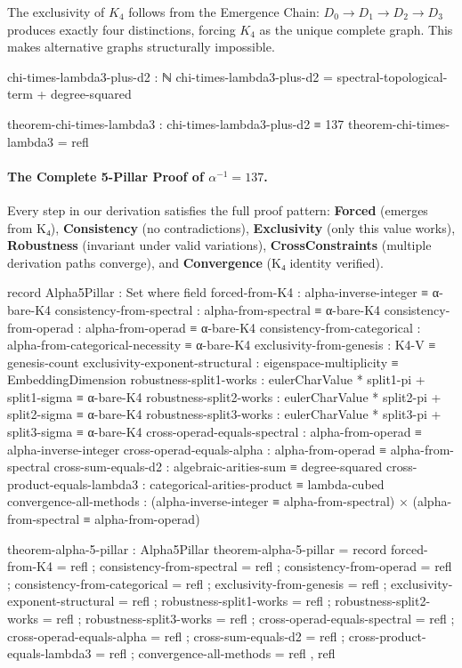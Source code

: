 \documentclass[11pt,a4paper]{book}
\begin{document}
The exclusivity of $K_4$ follows from the Emergence Chain: $D_0 \to D_1 \to D_2 \to D_3$ produces exactly
four distinctions, forcing $K_4$ as the unique complete graph. This makes alternative graphs structurally impossible.

\begin{code}
chi-times-lambda3-plus-d2 : ℕ
chi-times-lambda3-plus-d2 = spectral-topological-term + degree-squared

theorem-chi-times-lambda3 : chi-times-lambda3-plus-d2 ≡ 137
theorem-chi-times-lambda3 = refl
\end{code}

\paragraph{The Complete 5-Pillar Proof of $\alpha^{-1} = 137$.}

Every step in our derivation satisfies the full proof pattern:
\textbf{Forced} (emerges from K₄),
\textbf{Consistency} (no contradictions), 
\textbf{Exclusivity} (only this value works),
\textbf{Robustness} (invariant under valid variations),
\textbf{CrossConstraints} (multiple derivation paths converge), and
\textbf{Convergence} (K₄ identity verified).

\begin{code}
record Alpha5Pillar : Set where
  field
    forced-from-K4               : alpha-inverse-integer ≡ α-bare-K4
    consistency-from-spectral      : alpha-from-spectral ≡ α-bare-K4
    consistency-from-operad        : alpha-from-operad ≡ α-bare-K4
    consistency-from-categorical   : alpha-from-categorical-necessity ≡ α-bare-K4
    exclusivity-from-genesis       : K4-V ≡ genesis-count
    exclusivity-exponent-structural : eigenspace-multiplicity ≡ EmbeddingDimension
    robustness-split1-works        : eulerCharValue * split1-pi + split1-sigma ≡ α-bare-K4
    robustness-split2-works        : eulerCharValue * split2-pi + split2-sigma ≡ α-bare-K4
    robustness-split3-works        : eulerCharValue * split3-pi + split3-sigma ≡ α-bare-K4
    cross-operad-equals-spectral   : alpha-from-operad ≡ alpha-inverse-integer
    cross-operad-equals-alpha      : alpha-from-operad ≡ alpha-from-spectral
    cross-sum-equals-d2            : algebraic-arities-sum ≡ degree-squared
    cross-product-equals-lambda3   : categorical-arities-product ≡ lambda-cubed
    convergence-all-methods        : (alpha-inverse-integer ≡ alpha-from-spectral) × (alpha-from-spectral ≡ alpha-from-operad)

theorem-alpha-5-pillar : Alpha5Pillar
theorem-alpha-5-pillar = record
  { forced-from-K4             = refl
  ; consistency-from-spectral    = refl
  ; consistency-from-operad      = refl
  ; consistency-from-categorical = refl
  ; exclusivity-from-genesis     = refl
  ; exclusivity-exponent-structural = refl
  ; robustness-split1-works      = refl
  ; robustness-split2-works      = refl
  ; robustness-split3-works      = refl
  ; cross-operad-equals-spectral = refl
  ; cross-operad-equals-alpha    = refl
  ; cross-sum-equals-d2          = refl
  ; cross-product-equals-lambda3 = refl
  ; convergence-all-methods      = refl , refl
  }
\end{code}
\end{document}

